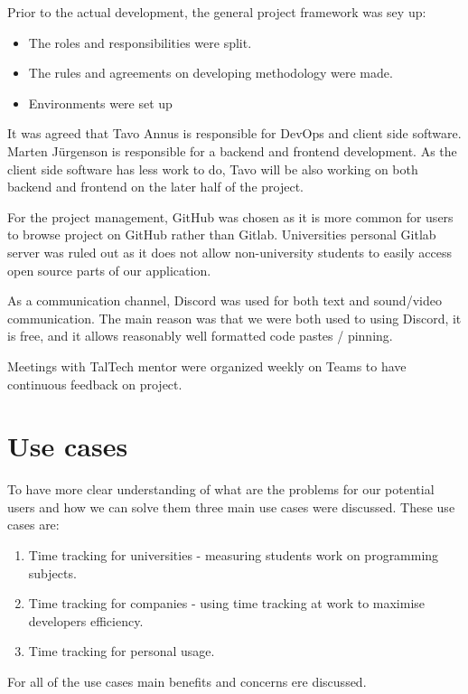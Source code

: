 Prior to the actual development, the general project framework was sey up:
\begin{itemize}
    \item The roles and responsibilities were split.
    \item The rules and agreements on developing methodology were made.
    \item Environments were set up
\end{itemize}

It was agreed that Tavo Annus is responsible for DevOps and client side software.
Marten Jürgenson is responsible for a backend and frontend development.
As the client side software has less work to do, Tavo will be also working on both backend and
frontend on the later half of the project.

For the project management, GitHub was chosen as it is more common for users to browse project on GitHub rather than Gitlab.
Universities personal Gitlab server was ruled out as it does not allow non-university students to easily access open source parts of our application.

As a communication channel, Discord was used for both text and sound/video communication.
The main reason was that we were both used to using Discord, it is free, and it allows reasonably well formatted code pastes / pinning.

Meetings with TalTech mentor were organized weekly on Teams to have continuous feedback on project.


\section{Use cases}\label{sec:use-cases}
To have more clear understanding of what are the problems for our potential users and how we can solve them three main use cases were discussed.
These use cases are:
\begin{enumerate}
    \item Time tracking for universities - measuring students work on programming subjects.
    \item Time tracking for companies - using time tracking at work to maximise developers efficiency.
    \item Time tracking for personal usage.
\end{enumerate}

For all of the use cases main benefits and concerns ere discussed.

